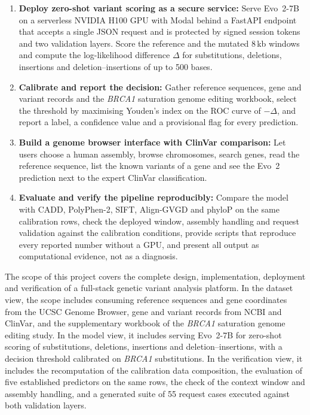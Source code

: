 \begin{enumerate}
\item \textbf{Deploy zero-shot variant scoring as a secure service:} Serve Evo~2-7B on a serverless NVIDIA H100 GPU with Modal behind a FastAPI endpoint that accepts a single JSON request and is protected by signed session tokens and two validation layers. Score the reference and the mutated 8\,kb windows and compute the log-likelihood difference $\Delta$ for substitutions, deletions, insertions and deletion--insertions of up to 500 bases.
\item \textbf{Calibrate and report the decision:} Gather reference sequences, gene and variant records and the \textit{BRCA1} saturation genome editing workbook, select the threshold by maximising Youden's index on the ROC curve of $-\Delta$, and report a label, a confidence value and a provisional flag for every prediction.
\item \textbf{Build a genome browser interface with ClinVar comparison:} Let users choose a human assembly, browse chromosomes, search genes, read the reference sequence, list the known variants of a gene and see the Evo~2 prediction next to the expert ClinVar classification.
\item \textbf{Evaluate and verify the pipeline reproducibly:} Compare the model with CADD, PolyPhen-2, SIFT, Align-GVGD and phyloP on the same calibration rows, check the deployed window, assembly handling and request validation against the calibration conditions, provide scripts that reproduce every reported number without a GPU, and present all output as computational evidence, not as a diagnosis.
\end{enumerate}

The scope of this project covers the complete design, implementation, deployment and verification of a full-stack genetic variant analysis platform. In the dataset view, the scope includes consuming reference sequences and gene coordinates from the UCSC Genome Browser, gene and variant records from NCBI and ClinVar, and the supplementary workbook of the \textit{BRCA1} saturation genome editing study. In the model view, it includes serving Evo~2-7B for zero-shot scoring of substitutions, deletions, insertions and deletion--insertions, with a decision threshold calibrated on \textit{BRCA1} substitutions. In the verification view, it includes the recomputation of the calibration data composition, the evaluation of five established predictors on the same rows, the check of the context window and assembly handling, and a generated suite of 55 request cases executed against both validation layers.

